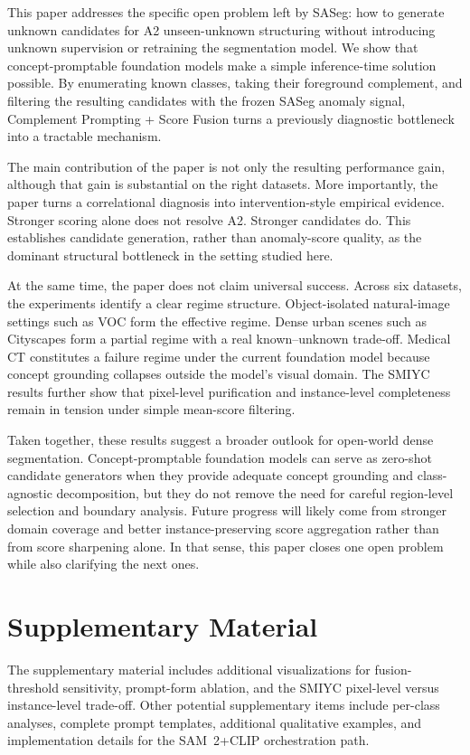 \documentclass[a4paper,fleqn]{cas-dc}
\newcommand{\method}{Complement Prompting + Score Fusion}
\newcommand{\samtwo}{SAM~2}
\newcommand{\clip}{CLIP}
\begin{document}
This paper addresses the specific open problem left by SASeg: how to generate unknown candidates for A2 unseen-unknown structuring without introducing unknown supervision or retraining the segmentation model. We show that concept-promptable foundation models make a simple inference-time solution possible. By enumerating known classes, taking their foreground complement, and filtering the resulting candidates with the frozen SASeg anomaly signal, \method{} turns a previously diagnostic bottleneck into a tractable mechanism.

The main contribution of the paper is not only the resulting performance gain, although that gain is substantial on the right datasets. More importantly, the paper turns a correlational diagnosis into intervention-style empirical evidence. Stronger scoring alone does not resolve A2. Stronger candidates do. This establishes candidate generation, rather than anomaly-score quality, as the dominant structural bottleneck in the setting studied here.

At the same time, the paper does not claim universal success. Across six datasets, the experiments identify a clear regime structure. Object-isolated natural-image settings such as VOC form the effective regime. Dense urban scenes such as Cityscapes form a partial regime with a real known--unknown trade-off. Medical CT constitutes a failure regime under the current foundation model because concept grounding collapses outside the model's visual domain. The SMIYC results further show that pixel-level purification and instance-level completeness remain in tension under simple mean-score filtering.

Taken together, these results suggest a broader outlook for open-world dense segmentation. Concept-promptable foundation models can serve as zero-shot candidate generators when they provide adequate concept grounding and class-agnostic decomposition, but they do not remove the need for careful region-level selection and boundary analysis. Future progress will likely come from stronger domain coverage and better instance-preserving score aggregation rather than from score sharpening alone. In that sense, this paper closes one open problem while also clarifying the next ones.

\appendix

\section{Supplementary Material}
\label{sec:appendix}

The supplementary material includes additional visualizations for fusion-threshold sensitivity, prompt-form ablation, and the SMIYC pixel-level versus instance-level trade-off. Other potential supplementary items include per-class analyses, complete prompt templates, additional qualitative examples, and implementation details for the \samtwo{}+\clip{} orchestration path.



\end{document}
